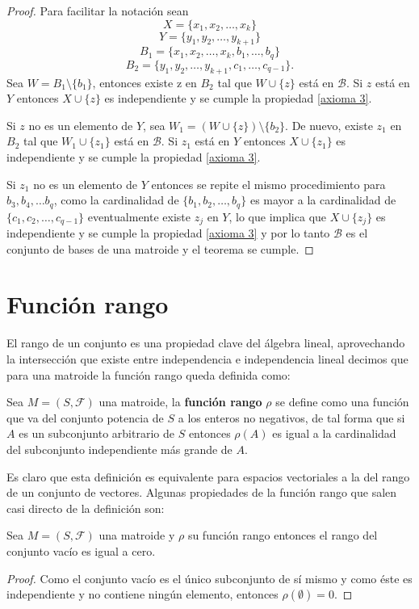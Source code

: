 \begin{proof}
Para facilitar la notación sean 
$$X = \{ x_1, x_2, \dots, x_k\}$$
$$Y = \{ y_1, y_2, \dots, y_{k+1}\}$$
$$B_1 = \{x_1, x_2, \dots, x_k, b_1, \dots, b_q \}$$
$$B_2 = \{y_1, y_2, \dots, y_{k+1}, c_1, \dots, c_{q-1} \}.$$
Sea $W = B_1 \setminus\{ b_1 \} $, entonces existe z en $B_2$ tal que $W \cup \{z\}$ está en $\mathcal{B}$. Si $z$ está en $Y$ entonces $X \cup \{z\}$ es independiente y se cumple la propiedad \ref{axioma 3}. 

Si $z$ no es un elemento de $Y$, sea $W_1= (W \cup \{ z \}) \setminus \{ b_2 \}$. De nuevo, existe $z_1$ en $B_2$ tal que $W_1 \cup \{ z_1 \}$ está en $\mathcal{B}$. Si $z_1$ está en $Y$ entonces $X \cup \{z_1\}$ es independiente y se cumple la propiedad \ref{axioma 3}. 

Si $z_1$ no es un elemento de $Y$ entonces se repite el mismo procedimiento para $b_3, b_4, \dots b_q$, como la cardinalidad de $\{ b_1, b_2, \dots, b_q\}$ es mayor a la cardinalidad de $\{c_1,c_2, \dots, c_{q-1}\}$ eventualmente existe $z_j$ en $Y$, lo que implica que $X \cup \{z_j\}$ es independiente y se cumple la propiedad \ref{axioma 3} y por lo tanto $\mathcal{B}$ es el conjunto de bases de una matroide y el teorema se cumple. 
\end{proof}

\section{Función rango}
El rango de un conjunto es una propiedad clave del álgebra lineal, aprovechando la intersección que existe entre independencia e independencia lineal decimos que para una matroide la función rango queda definida como: 

\begin{dfn}
Sea $M=(S,\mathcal{F})$ una matroide, la \textbf{función rango} $\rho$ se define como una función que va del conjunto potencia de $S$ a los enteros no negativos, de tal forma que si $A$ es un subconjunto arbitrario de $S$ entonces $\rho(A)$ es igual a la cardinalidad del subconjunto independiente más grande de $A$.
\end{dfn}

Es claro que esta definición es equivalente para espacios vectoriales a la del rango de un conjunto de vectores. Algunas propiedades de la función rango que salen casi directo de la definición son:
\begin{cor}\label{R1}
Sea $M=(S,\mathcal{F})$ una matroide y $\rho$ su función rango entonces
el rango del conjunto vacío es igual a cero. 
\end{cor}
\begin{proof} Como el conjunto vacío es el único subconjunto de sí mismo y como éste es independiente y no contiene ningún elemento, entonces $\rho(\emptyset)=0$. \end{proof}

